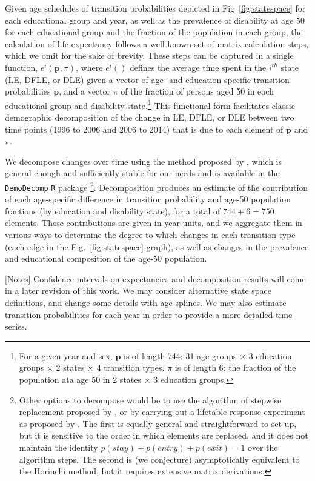 Given age schedules of transition probabilities depicted in Fig~\ref{fig:statespace} for each educational group and year, as well as the prevalence of disability at age 50 for each educational group and the fraction of the population in each group, the calculation of life expectancy follows a well-known set of matrix calculation steps, which we omit for the sake of brevity. These steps can be captured in a single function, $e^i(\textbf{p},\pi)$, where $e^i()$ defines the average time spent in the $i^{th}$ state (LE, DFLE, or DLE) given a vector of age- and education-specific transition probabilities $\textbf{p}$, and a vector $\pi$ of the fraction of persons aged 50 in each educational group and disability state.\footnote{For a given year and sex, $\textbf{p}$ is of length 744: 31 age groups $\times$ 3 education groups $\times$ 2 states $\times$ 4 transition types. $\pi$ is of length 6: the fraction of the population ata age 50 in 2 states $\times$ 3 education groups.} This functional form facilitates classic demographic decomposition of the change in LE, DFLE, or DLE between two time points (1996 to 2006 and 2006 to 2014) that is due to each element of $\textbf{p}$ and $\pi$. 

We decompose changes over time using the method proposed by \citet{horiuchi2008}, which is general enough and sufficiently stable for our needs and is available in the \texttt{DemoDecomp} \texttt{R} package \citep{DemoDecomp}\footnote{Other options to decompose would be to use the algorithm of stepwise replacement proposed by \citet{andreev2002algorithm}, or by carrying out a lifetable response experiment as proposed by \citet{caswell1989analysis}. The first is equally general and straightforward to set up, but it is sensitive to the order in which elements are replaced, and it does not maintain the identity $p(stay) + p(entry) + p(exit) = 1$ over the algorithm steps. The second is (we conjecture) asymptotically equivalent to the Horiuchi method, but it requires extensive matrix derivations.}. Decomposition produces an estimate of the contribution of each age-specific difference in transition probability and age-50 population fractions (by education and disability state), for a total of $744 + 6 = 750$ elements. These contributions are given in year-units, and we aggregate them in various ways to determine the degree to which changes in each transition type (each edge in the Fig.~\ref{fig:statespace} graph), as well as changes in the prevalence and educational composition of the age-50 population.

[Notes] Confidence intervals on expectancies and decomposition results will come in a later revision of this work. We may consider alternative state space definitions, and change some details with age splines. We may also estimate transition probabilities for each year in order to provide a more detailed time series. 

